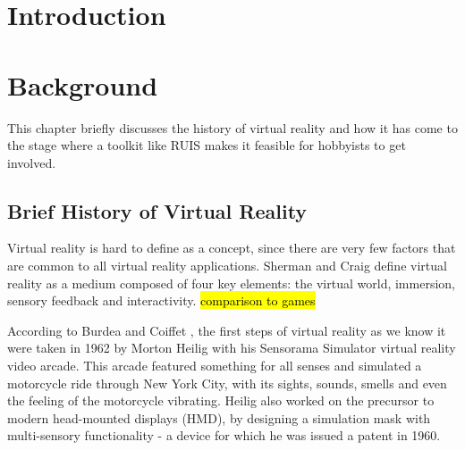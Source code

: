 \documentclass[12pt,a4paper,oneside,pdftex]{report}
\begin{document}
\pagestyle{headings}


% 

\chapter{Introduction}
\label{chapter:intro}


% 




\chapter{Background}
\label{chapter:background}

This chapter briefly discusses the history of virtual reality and how it has come to the stage where a toolkit like RUIS makes it feasible for hobbyists to get involved.

\section{Brief History of Virtual Reality}
\label{section:historyofvr}

Virtual reality is hard to define as a concept, since there are very few factors that are common to all virtual reality applications. Sherman and Craig \cite{Sherman:2002:UVR:581839} define virtual reality as a medium composed of four key elements: the virtual world, immersion, sensory feedback and interactivity. \hl{comparison to games}

According to Burdea and Coiffet \cite{Burdea:2003:VRT:829566}, the first steps of virtual reality as we know it were taken in 1962 by Morton Heilig with his Sensorama Simulator virtual reality video arcade. This arcade featured something for all senses and simulated a motorcycle ride through New York City, with its sights, sounds, smells and even the feeling of the motorcycle vibrating. Heilig also worked on the precursor to modern head-mounted displays (HMD), by designing a simulation mask with multi-sensory functionality - a device for which he was issued a patent in 1960. 
\end{document}

